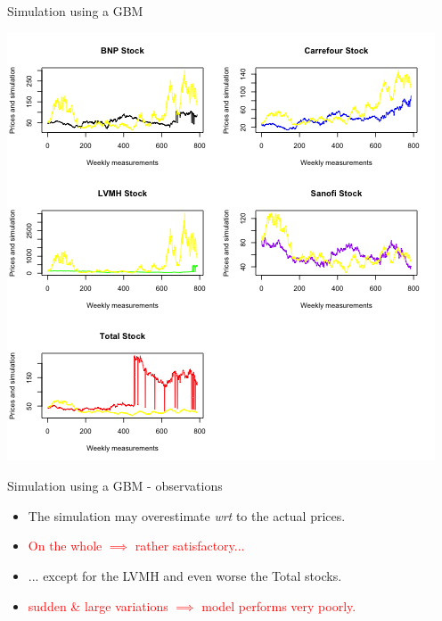 \documentclass{beamer}
\begin{document}
\begin{frame}{Simulation using a GBM }
	\begin{center}
		\includegraphics[scale = 0.45]{dataPlusSimulation.png}
	\end{center}
\end{frame}

\begin{frame}{Simulation using a GBM - observations}
	\begin{itemize}
		\item The simulation may overestimate \textit{wrt} to the actual prices. \\
		\item \textcolor{red}{On the whole $\implies$ rather satisfactory...} \\
		\item ... except for the LVMH and even worse the Total stocks. \\
		\item \textcolor{red}{sudden \& large variations $\implies$ model performs very poorly.}
	\end{itemize}
\end{frame}
\end{document}
